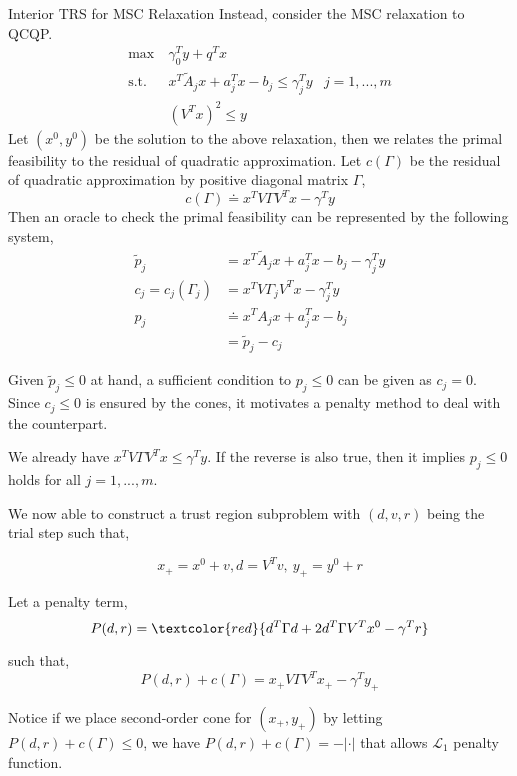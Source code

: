 \documentclass{beamerswitch}
\newcommand{\st}{\mathrm{s.t.\;}}
\newcommand{\red}[1]{\textcolor{red}{#1}}
\begin{document}
\begin{frame}[allowframebreaks]{Interior TRS for MSC Relaxation}
  Instead, consider the MSC relaxation to QCQP.
  \begin{equation}\label{eq.int.msc}
    \begin{aligned}
      \max ~ & \gamma_0^T y + q^Tx                                           \\
      \st  ~ & x^T\tilde A_j x + a_j ^Tx - b_j \le \gamma_j^Ty & j=1, ..., m \\
             & (V^T x)^2 \le y
    \end{aligned}
  \end{equation}
  Let \((x^0, y^0)\) be the solution to the above relaxation, then we relates the primal feasibility to the residual of quadratic approximation. Let \(c(\Gamma)\) be the residual of quadratic approximation by positive diagonal matrix \(\Gamma\),
  \[c (\Gamma) \doteq x^TV\Gamma V^T x - \gamma^Ty \]
  Then an oracle to check the primal feasibility can be represented by the following system,
  \begin{align*}
    \tilde p_j           & = x^T\tilde A_j x + a_j ^Tx - b_j - \gamma_j^Ty \\
    c_j = c_j (\Gamma_j) & = x^TV\Gamma_jV^T x - \gamma_j^Ty               \\
    p_j                  & \doteq x^TA_jx + a_j^Tx - b_j                   \\
                         & = \tilde p_j - c_j
  \end{align*}

  Given \(\tilde p_j \le 0\) at hand, a sufficient condition to \(p_j \le 0\) can be given as \(c_j = 0\). Since \(c_j \le 0\) is ensured by the cones, it motivates a penalty method to deal with the counterpart.

  \framebreak

  We already have \(x^TV\Gamma V^Tx \le \gamma^T y\). If the reverse is also true, then it implies \(p_j \le 0\) holds for all \(j = 1, ..., m\).

  We now able to construct a trust region subproblem with \((d, v, r)\) being the trial step such that,

  \[x_+ = x^0 + v, d = V^Tv, ~y_+ = y^0 + r\]


  Let a penalty term,
  \[P(d, r) = \red{d^T\Gamma d + 2 d^T \Gamma V^T x^0 - \gamma^T r}\]

  such that,
  \[P(d, r) + c(\Gamma) = x_+ V\Gamma V^Tx_+ - \gamma^T y_+\]

  Notice if we place second-order cone for \((x_+, y_+)\) by letting \(P(d, r) + c(\Gamma) \le 0\), we have \( P(d, r) + c(\Gamma) = - |\cdot |\) that allows \(\mathcal L_1\) penalty function.
  \framebreak


\end{frame}
\end{document}
